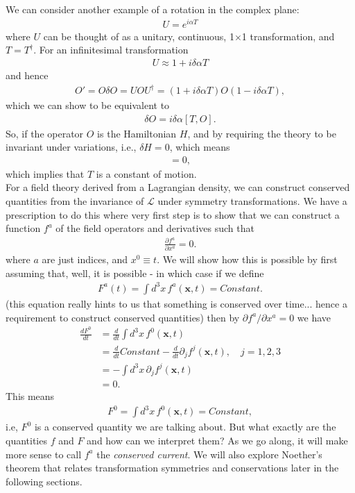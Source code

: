 \documentclass{book}
\numberwithin{equation}{section}
\theoremstyle{definition}
\newcommand{\p}{\partial}
\newcommand{\lag}{\mathcal{L}}
\begin{document}
We can consider another example of a rotation in the complex plane:
\begin{align}
U = e^{i\alpha T}
\end{align}
where $U$ can be thought of as a unitary, continuous, 1$\times$1 transformation, and $T = T^\dagger$. For an infinitesimal transformation
\begin{align}
U \approx 1 + i\delta \alpha T
\end{align}
and hence
\begin{align}
O' = O \delta O = UOU^\dagger = (1+i\delta \alpha T)O(1-i\delta \alpha T),
\end{align}
which we can show to be equivalent to
\begin{align}
\delta O = i\delta \alpha[T,O].
\end{align}
So, if the operator $O$ is the Hamiltonian $H$, and by requiring the theory to be invariant under variations, i.e., $\delta H = 0$, which means
\begin{align}
[T,H] = 0,
\end{align}
which implies that $T$ is a constant of motion. \\

For a field theory derived from a Lagrangian density, we can construct conserved quantities from the invariance of $\lag$ under symmetry transformations. We have a prescription to do this where very first step is to show that we can construct a function $f^a$ of the field operators and derivatives such that
\begin{align}
\frac{\p f^a}{\p x^a} = 0.
\end{align}
where $a$ are just indices, and $x^0 \equiv t$. We will show how this is possible by first assuming that, well, it is possible - in which case if we define 
\begin{align}
F^a(t) = \int d^3x\, f^a(\mathbf{x},t) = Constant.
\end{align}
(this equation really hints to us that something is conserved over time... hence a requirement to construct conserved quantities) then by $\p f^a/\p x^a = 0$ we have
\begin{align}
\frac{dF^0}{dt} &= \frac{d}{dt} \int d^3x\, f^0(\mathbf{x},t)\\
&= \frac{d}{dt}Constant - \frac{d}{dt} \p_j f^j(\mathbf{x},t),\,\,\,\,\,\, j = 1,2,3\\
&= -\int d^3x\, \p_j f^j(\mathbf{x},t)\\
&= 0.
\end{align}
This means
\begin{align}
F^0 = \int d^3x\, f^0(\mathbf{x},t) = Constant,
\end{align}
i.e, $F^0$ is a conserved quantity we are talking about. But what exactly are the quantities $f$ and $F$ and how can we interpret them? As we go along, it will make more sense to call $f^a$ the \textit{conserved current}. We will also explore Noether's theorem that relates transformation symmetries and conservations later in the following sections.\\
\end{document}
